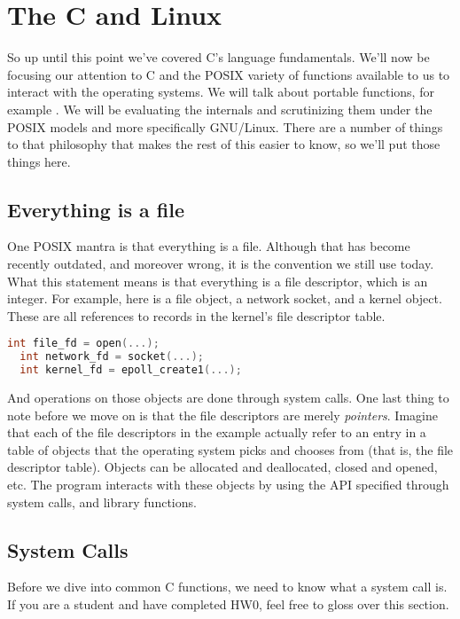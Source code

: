 \section{The C and Linux}

So up until this point we've covered C's language fundamentals.
We'll now be focusing our attention to C and the POSIX variety of functions available to us to interact with the operating systems.
We will talk about portable functions, for example  .
We will be evaluating the internals and scrutinizing them under the POSIX models and more specifically GNU/Linux.
There are a number of things to that philosophy that makes the rest of this easier to know, so we'll put those things here.

\subsection{Everything is a file}

One POSIX mantra is that everything is a file.
Although that has become recently outdated, and moreover wrong, it is the convention we still use today.
What this statement means is that everything is a file descriptor, which is an integer.
For example, here is a file object, a network socket, and a kernel object.
These are all references to records in the kernel's file descriptor table.

\begin{lstlisting}[language=C]
  int file_fd = open(...);
  int network_fd = socket(...);
  int kernel_fd = epoll_create1(...);
\end{lstlisting}

And operations on those objects are done through system calls.
One last thing to note before we move on is that the file descriptors are merely \textit{pointers}.
Imagine that each of the file descriptors in the example actually refer to an entry in a table of objects that the operating system picks and chooses from (that is, the file descriptor table).
Objects can be allocated and deallocated, closed and opened, etc.
The program interacts with these objects by using the API specified through system calls, and library functions.

\subsection{System Calls}

Before we dive into common C functions, we need to know what a system call is.
If you are a student and have completed HW0, feel free to gloss over this section.

